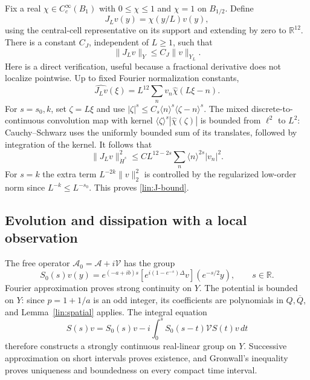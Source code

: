 \documentclass[11pt]{article}
\numberwithin{equation}{section}
\theoremstyle{definition}
\theoremstyle{remark}
\begin{document}
Fix a real $\chi\in C_c^\infty(B_1)$ with $0\le\chi\le1$ and
$\chi=1$ on $B_{1/2}$.  Define
\begin{equation}\label{lin:localization}
 J_Lv(y)=\chi(y/L)v(y),
\end{equation}
using the central-cell representative on its support and extending by
zero to $\mathbb R^{12}$.  There is a constant $C_J$, independent of
$L\ge1$, such that
\begin{equation}\label{lin:J-bound}
 \|J_Lv\|_Y\le C_J\|v\|_{Y_L}.
\end{equation}
Here is a direct verification, useful because a fractional derivative
does not localize pointwise.  Up to fixed Fourier normalization constants,
\[
 \widehat{J_Lv}(\xi)=L^{12}\sum_nv_n\widehat\chi(L\xi-n).
\]
For $s=s_0,k$, set $\zeta=L\xi$ and use
$|\zeta|^s\le C_s\langle n\rangle^s\langle\zeta-n\rangle^s$.
The mixed discrete-to-continuous convolution map with kernel
$\langle\zeta\rangle^s|\widehat\chi(\zeta)|$ is bounded from
$\ell^2$ to $L^2$: Cauchy--Schwarz uses the uniformly bounded sum of
its translates, followed by integration of the kernel.  It follows that
\[
 \|J_Lv\|_{\dot H^s}^2
 \le C L^{12-2s}\sum_n\langle n\rangle^{2s}|v_n|^2.
\]
For $s=k$ the extra term $L^{-2k}\|v\|_2^2$ is controlled by the
regularized low-order norm since $L^{-k}\le L^{-s_0}$.  This proves
\eqref{lin:J-bound}.

\subsection{Evolution and dissipation with a local observation}

The free operator $\mathcal A_0=\mathcal A+i\mathcal V$ has the group
\begin{equation}\label{lin:free-flow}
 S_0(s)v(y)=e^{(-a+ib)s}
 \left[e^{i(1-e^{-s})\Delta}v\right](e^{-s/2}y),\qquad s\in\mathbb R.
\end{equation}
Fourier approximation proves strong continuity on $Y$.  The potential
is bounded on $Y$: since $p=1+1/a$ is an odd integer, its coefficients
are polynomials in $Q,\overline Q$, and Lemma~\ref{lin:spatial} applies.
The integral equation
\begin{equation}\label{lin:mild}
 S(s)v=S_0(s)v-i\int_0^s S_0(s-t)\mathcal V S(t)v\,dt
\end{equation}
therefore constructs a strongly continuous real-linear group on $Y$.
Successive approximation on short intervals proves existence, and
Gronwall's inequality proves uniqueness and boundedness on every compact
time interval.
\end{document}
